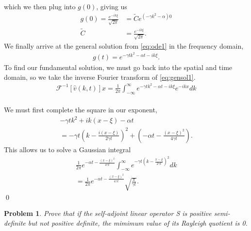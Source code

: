 \documentclass[12pt]{article}
\newtheorem{problem}{Problem}
\begin{document}
which we then plug into $g(0)$, giving us
\begin{align*}
    g(0) = \frac{e^{-ik\xi}}{\sqrt{2\pi}} &= \tilde{C}e^{(-\gamma k^2-\alpha)0}\\
    \tilde{C}& = \frac{e^{-ik\xi}}{\sqrt{2\pi}}.
\end{align*}
We finally arrive at the general solution from \ref{eq:ode1} in the frequency domain,
\begin{align}
    g(t) = e^{-\gamma tk^2 - \alpha t -ik \xi}. \label{eq:gensol1}
\end{align}
To find our fundamental solution, we must go back into the spatial and time domain, so we take the inverse Fourier transform of \ref{eq:gensol1}.
\begin{align*}
    \mathcal{F}^{-1}[\hat{v}(k, t)]{x} = \frac{1}{2\pi} \int_{-\infty}^{\infty} e^{-\gamma tk^2 - \alpha t -ik \xi}e^{-ikx} dk
\end{align*}
\\ We must first complete the square in our exponent,
\begin{gather*}
    -\gamma t k^2 + ik(x-\xi) - \alpha t \\
    = -\gamma t(k-\frac{i(x-\xi)}{2\gamma t})^2 + (-\alpha t - \frac{(x-\xi)^2}{4\gamma t} ).
\end{gather*}
This allows us to solve a Gaussian integral
\begin{gather*}
    \frac{1}{2\pi} e^{-\alpha t - \frac{(x-\xi)^2}{4\gamma t}} \int_{-\infty}^{\infty} e^{-\gamma t (k-\frac{x-\xi}{2\gamma t} )^2}dk \\
    = \frac{1}{2\pi} e^{-\alpha t - \frac{(x-\xi)^2}{4\gamma t}} \sqrt{\frac{\pi}{\gamma t}}.
\end{gather*}
\qed


\newpage
\begin{problem}
Prove that if the self-adjoint linear operator S is positive semi-definite but not positive definite, the mimimum value of its Rayleigh quotient is 0.
\end{problem}
\end{document}
